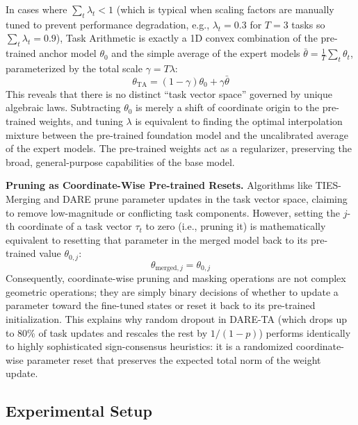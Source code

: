 \documentclass{article}
\begin{document}
In cases where $\sum_t \lambda_t < 1$ (which is typical when scaling factors are manually tuned to prevent performance degradation, e.g., $\lambda_t = 0.3$ for $T=3$ tasks so $\sum_t \lambda_t = 0.9$), Task Arithmetic is exactly a 1D convex combination of the pre-trained anchor model $\theta_0$ and the simple average of the expert models $\bar{\theta} = \frac{1}{T}\sum_t \theta_t$, parameterized by the total scale $\gamma = T\lambda$:
\begin{equation}
    \theta_{\text{TA}} = (1 - \gamma)\theta_0 + \gamma \bar{\theta}
\end{equation}
This reveals that there is no distinct ``task vector space'' governed by unique algebraic laws. Subtracting $\theta_0$ is merely a shift of coordinate origin to the pre-trained weights, and tuning $\lambda$ is equivalent to finding the optimal interpolation mixture between the pre-trained foundation model and the uncalibrated average of the expert models. The pre-trained weights act as a regularizer, preserving the broad, general-purpose capabilities of the base model.

\textbf{Pruning as Coordinate-Wise Pre-trained Resets.} Algorithms like TIES-Merging and DARE prune parameter updates in the task vector space, claiming to remove low-magnitude or conflicting task components. However, setting the $j$-th coordinate of a task vector $\tau_t$ to zero (i.e., pruning it) is mathematically equivalent to resetting that parameter in the merged model back to its pre-trained value $\theta_{0,j}$:
\begin{equation}
    \theta_{\text{merged},j} = \theta_{0,j}
\end{equation}
Consequently, coordinate-wise pruning and masking operations are not complex geometric operations; they are simply binary decisions of whether to update a parameter toward the fine-tuned states or reset it back to its pre-trained initialization. This explains why random dropout in DARE-TA (which drops up to 80\% of task updates and rescales the rest by $1/(1-p)$) performs identically to highly sophisticated sign-consensus heuristics: it is a randomized coordinate-wise parameter reset that preserves the expected total norm of the weight update.

\subsection{Experimental Setup}
\end{document}
